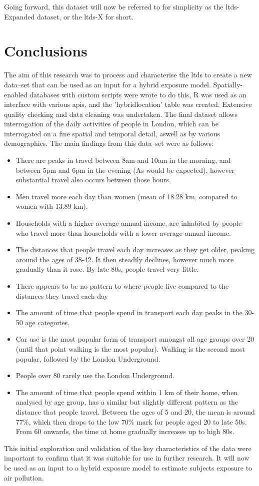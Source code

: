 Going forward, this dataset will now be referred to for simplicity as the \gls{ltds}-Expanded dataset, or the \gls{ltds}-X for short.

\section{Conclusions}
\label{sec:1conclusions}

The aim of this research was to process and characterise the \gls{ltds} to create a new data--set that can be used as an input for a hybrid exposure model. Spatially-enabled databases with custom scripts were wrote to do this, R was used as an interface with various \gls{api}s, and the 'hybrid\textunderscore location' table was created. Extensive quality checking and data cleaning was undertaken. The final dataset allows interrogation of the daily activities of people in London, which can be interrogated on a fine spatial and temporal detail, aswell as by various demographics. The main findings from this data--set were as follows:

\begin{itemize}
\item There are peaks in travel between 8am and 10am in the morning, and between 5pm and 6pm in the evening (As would be expected), however substantial travel also occurs between those hours.
\item Men travel more each day than women (mean of 18.28 km, compared to women with 13.89 km).
\item Households with a higher average annual income, are inhabited by people who travel more than households with a lower average annual income.
\item The distances that people travel each day increases as they get older, peaking around the ages of 38-42. It then steadily declines, however much more gradually than it rose. By late 80s, people travel very little.
\item There appears to be no pattern to where people live compared to the distances they travel each day
\item The amount of time that people spend in transport each day peaks in the 30-50 age categories.
\item Car use is the most popular form of transport amongst all age groups over 20 (until that point walking is the most popular). Walking is the second most popular, followed by the London Underground.
\item People over 80 rarely use the London Underground.
\item The amount of time that people spend within 1 km of their home, when analysed by age group, has a similar but slightly different pattern as the distance that people travel. Between the ages of 5 and 20, the mean is around 77\%, which then drops to the low 70\% mark for people aged 20 to late 50s. From 60 onwards, the time at home gradually increases up to high 80s.
\end{itemize}

This initial exploration and validation of the key characteristics of the data were important to confirm that it was suitable for use in further research. It will now be used as an input to a hybrid exposure model to estimate subjects exposure to air pollution. 
